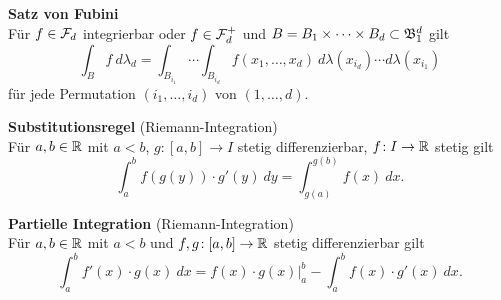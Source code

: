 \textbf{Satz von Fubini}\\
Für $f\in\mathcal{F}_d$ integrierbar oder $f\in\mathcal{F}_d^+$ und
$B = B_1 \times\cdots\times B_d \subset \mathfrak{B}_1^d$ gilt
\[
  \int_B f~d\lambda_d = \int_{B_{i_1}} \cdots \int_{B_{i_d}} f(x_1,\ldots,x_d)~
  d\lambda(x_{i_d}) \cdots d\lambda(x_{i_1})
\]
für jede Permutation $(i_1,\ldots,i_d)$ von $(1,\ldots,d)$.

\textbf{Substitutionsregel} (Riemann-Integration)\\
Für $a,b\in\mathbb{R}$ mit $a<b$, $g\!: [a,b] \to I$ stetig differenzierbar,
$f\!: I\to\mathbb{R}$ stetig gilt
\[
  \int_a^b f(g(y)) \cdot g'(y)~dy = \int_{g(a)}^{g(b)}f(x)~dx.
\]

\textbf{Partielle Integration} (Riemann-Integration)\\
Für $a,b\in\mathbb{R}$ mit $a<b$ und $f,g\!: [a,b]\to\mathbb{R}$ stetig differenzierbar gilt
\[
  \int_a^b f'(x) \cdot g(x)~dx
  = f(x) \cdot g(x) \Big\vert_a^b - \int_a^b f(x) \cdot g'(x)~dx.
\]
